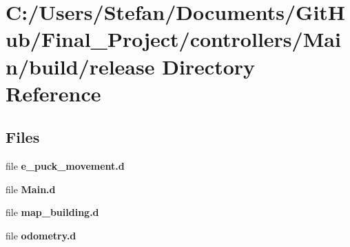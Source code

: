 \section{C\-:/\-Users/\-Stefan/\-Documents/\-Git\-Hub/\-Final\-\_\-\-Project/controllers/\-Main/build/release Directory Reference}
\label{dir_33396ef7498af4ba63da784be58c9ffe}
\subsection*{Files}
\begin{DoxyCompactItemize}
\item 
file {\bf e\-\_\-puck\-\_\-movement.\-d}
\item 
file {\bf Main.\-d}
\item 
file {\bf map\-\_\-building.\-d}
\item 
file {\bf odometry.\-d}
\end{DoxyCompactItemize}
